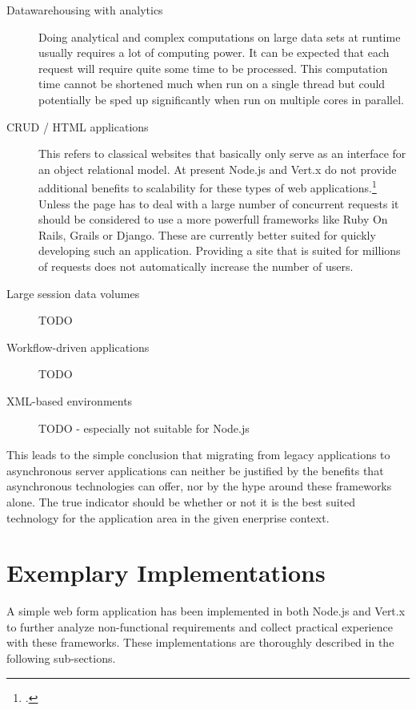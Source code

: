 \begin{description}
  \item[Datawarehousing with analytics] Doing analytical and complex computations
  	on large data sets at runtime usually requires a lot of computing power.
  	It can be expected that each request will require quite some time to be processed.
  	This computation time cannot be shortened much when run on a single thread but 
  	could potentially be sped up significantly when run on multiple cores in parallel. 
  \item[CRUD / HTML applications] 
	This refers to classical websites that basically only serve as an interface for
	an object relational model.
	At present Node.js and Vert.x do not provide additional benefits to scalability
	for these types of web applications.\footcite[Cf.][15]{Roden_2012} Unless the page has to deal with a large number of
	concurrent requests it should be considered to use a more powerfull frameworks
	like Ruby On Rails, Grails or Django. These are currently better suited for quickly
	developing such an application. Providing a site that is suited for 
	millions of requests does not automatically increase the number of users.
  \item[Large session data volumes] TODO
  \item[Workflow-driven applications] TODO
  \item[XML-based environments] TODO - especially not suitable for Node.js
\end{description}

This leads to the simple conclusion that migrating from legacy applications to asynchronous
server applications can neither be justified by the benefits that asynchronous technologies
can offer, nor by the hype around these frameworks alone. The true indicator should be whether
or not it is the best suited technology for the application area in the given enerprise context.
    


\newpage
\section{Exemplary Implementations}
\label{exemplary_implementations}

A simple web form application has been implemented in both Node.js and Vert.x to
further analyze non-functional requirements and collect practical experience
with these frameworks. These implementations are thoroughly described in the following sub-sections.

